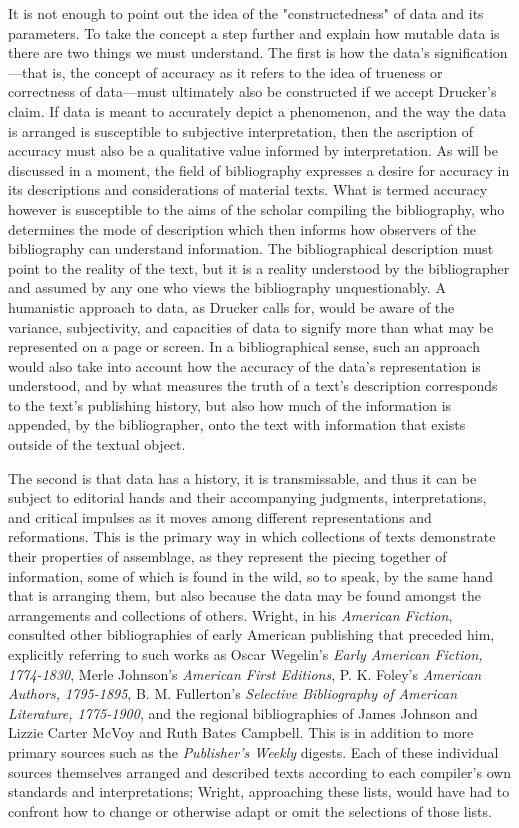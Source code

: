 It is not enough to point out the idea of the "constructedness" of data and its parameters. To take the concept a step further and explain how mutable data is there are two things we must understand. The first is how the data's signification---that is, the concept of accuracy as it refers to the idea of trueness or correctness of data---must ultimately also be constructed if we accept Drucker's claim. If data is meant to accurately depict a phenomenon, and the way the data is arranged is susceptible to subjective interpretation, then the ascription of accuracy must also be a qualitative value informed by interpretation. As will be discussed in a moment, the field of bibliography expresses a desire for accuracy in its descriptions and considerations of material texts. What is termed accuracy however is susceptible to the aims of the scholar compiling the bibliography, who determines the mode of description which then informs how observers of the bibliography can understand information. The bibliographical description must point to the reality of the text, but it is a reality understood by the bibliographer and assumed by any one who views the bibliography unquestionably. A humanistic approach to data, as Drucker calls for, would be aware of the variance, subjectivity, and capacities of data to signify more than what may be represented on a page or screen. In a bibliographical sense, such an approach would also take into account how the accuracy of the data's representation is understood, and by what measures the truth of a text's description corresponds to the text's publishing history, but also how much of the information is appended, by the bibliographer, onto the text with information that exists outside of the textual object. 

The second is that data has a history, it is transmissable, and thus it can be subject to editorial hands and their accompanying judgments, interpretations, and critical impulses as it moves among different representations and reformations. This is the primary way in which collections of texts demonstrate their properties of assemblage, as they represent the piecing together of information, some of which is found in the wild, so to speak, by the same hand that is arranging them, but also because the data may be found amongst the arrangements and collections of others. Wright, in his \textit{American Fiction}, consulted other bibliographies of early American publishing that preceded him, explicitly referring to such works as Oscar Wegelin's \textit{Early American Fiction, 1774-1830}, Merle Johnson's \textit{American First Editions}, P. K. Foley's \textit{American Authors, 1795-1895}, B. M. Fullerton's \textit{Selective Bibliography of American Literature, 1775-1900}, and the regional bibliographies of James Johnson and Lizzie Carter McVoy and Ruth Bates Campbell. This is in addition to more primary sources such as the \textit{Publisher's Weekly} digests.\autocite{wright_pursuit_1966} Each of these individual sources themselves arranged and described texts according to each compiler's own standards and interpretations; Wright, approaching these lists, would have had to confront how to change or otherwise adapt or omit the selections of those lists. 

